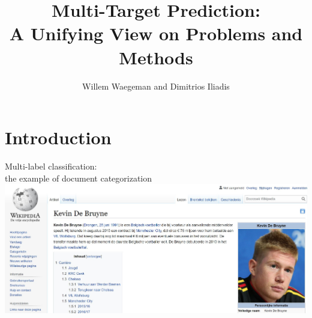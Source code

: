 \documentclass[]{beamer}
\title[]{Multi-Target Prediction:\\ 
A Unifying View on Problems and Methods}
\author[Willem Waegeman]{Willem Waegeman and Dimitrios Iliadis}
\institute[VFU] %
{
  \inst{}
Department of Data Analysis and Mathematical Modelling, Ghent University, Belgium
}
\begin{document}
\frame{\titlepage}


\section{Introduction}

		
		\begin{frame}[plain]
     \end{frame}



\begin{frame}{Multi-label classification: \\
the example of document categorization}
\includegraphics[scale=0.17]{pics/kdb}
\end{frame}
\end{document}
